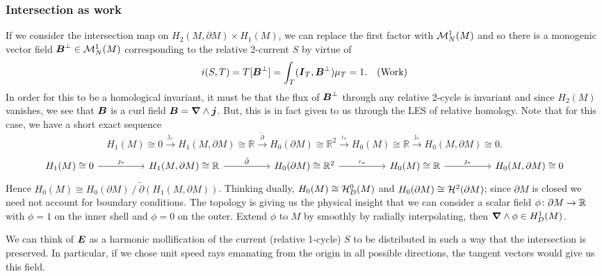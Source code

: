 \documentclass{article}
\begin{document}
\subsubsection{Intersection as work}
If we consider the intersection map on $H_2(M,\partial M) \times H_{1}(M)$, we can replace the first factor with $\mathcal{M}^1_N(M)$ and so there is a monogenic vector field $\boldsymbol{B}^\perp\in \mathcal{M}^1_N(M)$ corresponding to the relative 2-current $S$ by virtue of
\begin{align*}
i(S,T) = T[\boldsymbol{B}^\perp] = \int_T(\boldsymbol{I}_T,\boldsymbol{B}^\perp)\mu_T= 1. && \textrm{(Work)}
\end{align*}
 In order for this to be a homological invariant, it must be that the flux of $\boldsymbol{B}^\perp$ through any relative 2-cycle is invariant and since $H_2(M)$ vanishes, we see that $\boldsymbol{B}$ is a curl field $\boldsymbol{B}=\boldsymbol{\nabla} \wedge \boldsymbol{j}$. But, this is in fact given to us through the LES of relative homology. Note that for this case, we have a short exact sequence 
\[
H_1(M) \cong 0 \xrightarrow{~\jmath_*~} H_1(M,\partial M)\cong \mathbb{R} \xrightarrow{~\tilde{\partial}~} H_0(\partial M) \cong \mathbb{R}^2 \xrightarrow{~\iota_*~} H_0(M)\cong \mathbb{R} \xrightarrow{~\jmath_*~} H_0(M, \partial M)\cong 0.
\]
\[
\begin{tikzcd}
H_1(M)\cong 0 \arrow[rr, "\jmath_*"] &  & {H_1(M,\partial M)\cong \mathbb{R}} \arrow[rr, "\tilde{\partial}"] &  & H_0(\partial M) \cong \mathbb{R}^2 \arrow[rr, "\iota_*"] &  & H_0(M)\cong \mathbb{R} \arrow[rr, "\jmath_*"] &  & {H_0(M,\partial M)\cong 0}
\end{tikzcd}
\]
Hence $H_0(M)\cong H_0(\partial M)~/~ \tilde{\partial}(H_1(M,\partial M))$. Thinking dually, $H_0(M)\cong\mathcal{H}^0_D(M)$ and $H_0(\partial M)\cong \mathcal{H}^2(\partial M)$; since $\partial M$ is closed we need not account for boundary conditions.  The topology is giving us the physical insight that we can consider a scalar field $\phi \colon \partial M \to \mathbb{R}$ with $\phi=1$ on the inner shell and $\phi=0$ on the outer. Extend $\phi$ to $M$ by smoothly by radially interpolating, then $\boldsymbol{\nabla} \wedge \phi \in H^1_D(M)$. 

We can think of $\boldsymbol{E}$ as a harmonic mollification of the current (relative 1-cycle) $S$ to be distributed in such a way that the intersection is preserved. In particular, if we chose unit speed rays emanating from the origin in all possible directions, the tangent vectors would give us this field.
\end{document}
